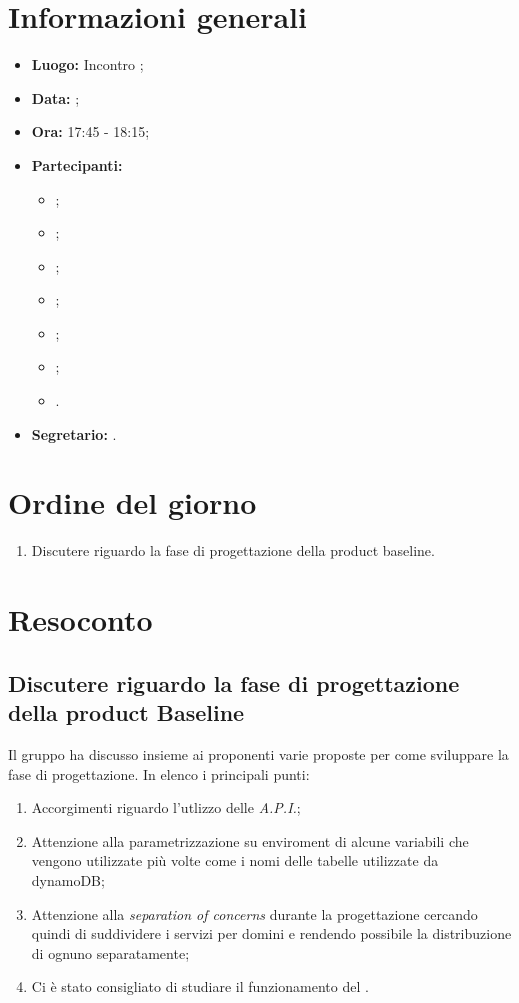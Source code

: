 \section{Informazioni generali}
\begin{itemize}
\item \textbf{Luogo:} Incontro ;
\item \textbf{Data:} \Data;
\item \textbf{Ora:} 17:45 - 18:15;
\item \textbf{Partecipanti:}
	\begin{itemize}
		\item \BL{}; 
		\item \FF{};
		\item \MM{};
		\item \TG{};
		\item \PC{};
		\item \TL{};
		\item \Proponente{}.
	\end{itemize}
\item \textbf{Segretario:} \MM{}.
\end{itemize}

\section{Ordine del giorno}
\begin{enumerate}
	\item Discutere riguardo la fase di progettazione della product baseline.
\end{enumerate}

\section{Resoconto}
\subsection{Discutere riguardo la fase di progettazione della product Baseline}
Il gruppo ha discusso insieme ai proponenti varie proposte per come sviluppare la fase di progettazione. In elenco i principali punti:
\begin{enumerate}
	\item Accorgimenti riguardo l'utlizzo delle \textit{A.P.I.};
	\item Attenzione alla parametrizzazione su enviroment di alcune variabili che vengono utilizzate più volte come i nomi delle tabelle utilizzate da dynamoDB;
	\item Attenzione alla \textit{separation of concerns} durante la progettazione cercando quindi di suddividere i servizi per domini e rendendo possibile la distribuzione di ognuno separatamente;
	\item Ci è stato consigliato di studiare il funzionamento del .
\end{enumerate}

